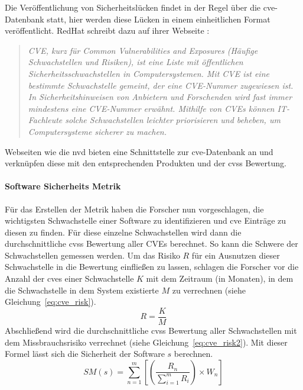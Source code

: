 \documentclass[12pt, a4paper, ngerman]{article}
\begin{document}
Die Veröffentlichung von Sicherheitslücken findet in der Regel über die \ac{cve}-Datenbank statt, 
hier werden diese Lücken in einem einheitlichen Format veröffentlicht.
RedHat schreibt dazu auf ihrer Webseite \cite{Redhat_CVE}: 
\begin{quote}
  \textit{
    CVE, kurz für Common Vulnerabilities and Exposures (Häufige Schwachstellen und Risiken), ist eine Liste mit öffentlichen Sicherheitsschwachstellen in Computersystemen. Mit CVE ist eine bestimmte Schwachstelle gemeint, der eine CVE-Nummer zugewiesen ist.
    In Sicherheitshinweisen von Anbietern und Forschenden wird fast immer mindestens eine CVE-Nummer erwähnt. Mithilfe von CVEs können IT-Fachleute solche Schwachstellen leichter priorisieren und beheben, um Computersysteme sicherer zu machen.
  } 
\end{quote}
Webseiten wie die \ac{nvd} bieten eine Schnittstelle zur \ac{cve}-Datenbank an und 
verknüpfen diese mit den entsprechenden Produkten und der \ac{cvss} Bewertung.

\paragraph{Software Sicherheits Metrik}

Für das Erstellen der Metrik haben die Forscher nun vorgeschlagen, 
die wichtigsten Schwachstelle einer Software zu identifizieren und \ac{cve} Einträge zu diesen zu finden.
Für diese einzelne Schwachstellen wird dann die durchschnittliche \ac{cvss} Bewertung aller CVEs berechnet.
So kann die Schwere der Schwachstellen gemessen werden.
Um das Risiko \(R\) für ein Ausnutzen dieser Schwachstelle in die Bewertung einfließen zu lassen, 
schlagen die Forscher vor die Anzahl der \ac{cve}s einer Schwachstelle \(K\) mit dem Zeitraum (in Monaten), in dem die Schwachstelle in dem System existierte \(M\) zu verrechnen (siehe Gleichung~\ref{eq:cve_risk}).
\begin{equation} \label{eq:cve_risk}
  R = \frac{ K }{ M }
\end{equation}
Abschließend wird die durchschnittliche \ac{cvss} Bewertung aller Schwachstellen mit dem Missbrauchsrisiko verrechnet (siehe Gleichung~\ref{eq:cve_risk2}).
Mit dieser Formel lässt sich die Sicherheit der Software \(s\) berechnen.
\begin{equation} \label{eq:cve_risk2}
  SM \left( s \right) = \sum_{ n=1 }^{ m }{ \left[ \left( \frac{ R_{ n } }{ \sum_{ i=1 }^{ m }{ R_{ i } } } \right) \times W_{ n } \right] }
\end{equation}
\end{document}
